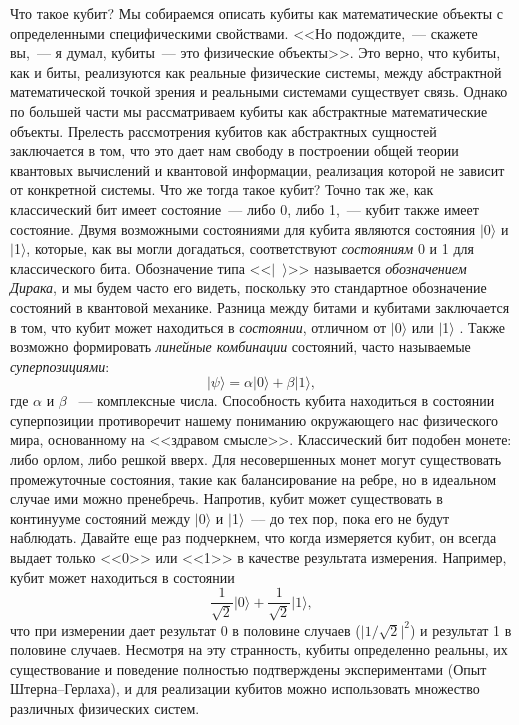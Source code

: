 \begin{multicols}{2}
{    Что такое кубит? Мы собираемся описать кубиты как математические объекты с определенными
    специфическими свойствами. <<Но подождите,~--- скажете вы,~--- я думал, кубиты~--- это физические объекты>>. Это верно, что кубиты, как и биты, реализуются как реальные физические системы, между абстрактной математической точкой зрения и реальными системами существует связь.
    Однако по большей части мы рассматриваем кубиты как абстрактные математические объекты. Прелесть рассмотрения кубитов как абстрактных сущностей заключается в том, что это
    дает нам свободу в построении общей теории квантовых вычислений и квантовой
    информации, реализация которой не зависит от конкретной системы.
    Что же тогда такое кубит? Точно так же, как классический бит имеет состояние~--- либо 0, либо 1,~--- кубит также имеет состояние. Двумя возможными состояниями для кубита являются состояния $\vert$0$\rangle$ и $\vert$1$\rangle$, которые, как вы могли
    догадаться, соответствуют \emph{состояниям} 0 и 1 для классического бита. Обозначение типа <<$\vert$~$\rangle$>> называется \emph{обозначением Дирака}, и мы будем часто его видеть, поскольку это стандартное обозначение состояний в квантовой механике. Разница между битами и кубитами заключается в том, что кубит может находиться в \emph{состоянии}, отличном от $\vert$0$\rangle$ или $\vert$1$\rangle$ . Также возможно формировать \emph{линейные комбинации} состояний, часто называемые \emph{суперпозициями}:
    \begin{equation}
        \vert\psi\rangle = \alpha\vert0\rangle + \beta\vert1\rangle,
    \end{equation}
    где $\alpha$ и $\beta$ ~--- комплексные числа.
    Способность кубита находиться в состоянии суперпозиции противоречит нашему
    пониманию окружающего нас физического мира, основанному на <<здравом смысле>>. Классический бит подобен монете: либо орлом, либо решкой вверх. Для несовершенных монет могут существовать промежуточные состояния, такие как балансирование на ребре, но в идеальном случае ими можно пренебречь. Напротив, кубит может существовать в континууме состояний между $\vert$0$\rangle$ и $\vert$1$\rangle$~--– до тех пор, пока его не будут наблюдать. Давайте еще
    раз подчеркнем, что когда измеряется кубит, он всегда выдает только <<0>> или <<1>> в качестве результата измерения. Например, кубит может находиться в состоянии
    \begin{equation}
        \frac{1}{\sqrt{2}}\vert0\rangle+\frac{1}{\sqrt{2}}\vert1\rangle,
    \end{equation}
    что при измерении дает результат 0 в половине случаев ($\vert1/\sqrt{2}\vert^2$) и результат 1 в половине случаев.
    Несмотря на эту странность, кубиты определенно реальны, их существование и поведение полностью подтверждены экспериментами (Опыт Штерна--Герлаха), и для реализации кубитов можно использовать множество различных физических систем.
    
}
\end{multicols}
